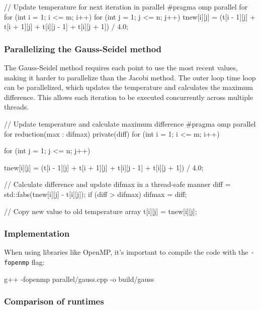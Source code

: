 \documentclass[11pt,a4paper]{article}
\begin{document}
\begin{VerbatimWrap}
// Update temperature for next iteration in parallel
#pragma omp parallel for
for (int i = 1; i <= m; i++)
{
    for (int j = 1; j <= n; j++)
    {
        tnew[i][j] = (t[i - 1][j] + t[i + 1][j] + t[i][j - 1] + t[i][j + 1]) / 4.0;
    }
}
\end{VerbatimWrap}

\subsubsection{Parallelizing the Gauss-Seidel method}

The Gauss-Seidel method requires each point to use the most recent values, 
making it harder to parallelize than the Jacobi method.
The outer loop time loop can be parallelized, 
which updates the temperature and calculates the maximum difference. 
This allows each iteration to be executed concurrently across multiple threads.

\begin{VerbatimWrap}
// Update temperature and calculate maximum difference
#pragma omp parallel for reduction(max : difmax) private(diff)
for (int i = 1; i <= m; i++)
{
    for (int j = 1; j <= n; j++)
    {
        tnew[i][j] = (t[i - 1][j] + t[i + 1][j] + t[i][j - 1] + t[i][j + 1]) / 4.0;

        // Calculate difference and update difmax in a thread-safe manner
        diff = std::fabs(tnew[i][j] - t[i][j]);
        if (diff > difmax)
        {
            difmax = diff;
        }

        // Copy new value to old temperature array
        t[i][j] = tnew[i][j];
    }
}
\end{VerbatimWrap}

\subsubsection{Implementation}

When using libraries like OpenMP, 
it's important to compile the code with the \texttt{-fopenmp} flag:

\begin{VerbatimWrap}
  g++ -fopenmp parallel/gauss.cpp -o build/gauss
\end{VerbatimWrap}

\subsubsection{Comparison of runtimes}
\end{document}
